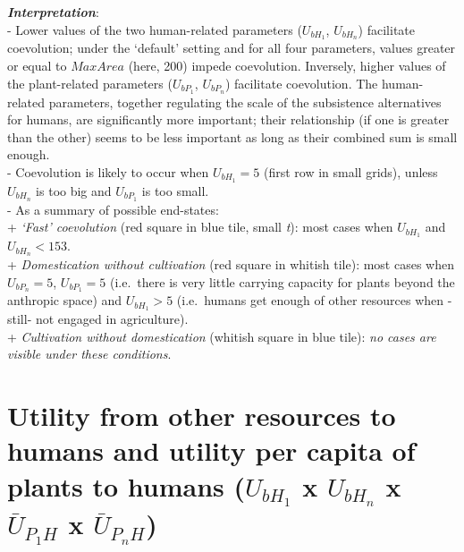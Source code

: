\documentclass[]{book}
\begin{document}
\textbf{\emph{Interpretation}}:\\
- Lower values of the two human-related parameters (\(U_{bH_{1}}\), \(U_{bH_{n}}\)) facilitate coevolution; under the `default' setting and for all four parameters, values greater or equal to \(MaxArea\) (here, 200) impede coevolution. Inversely, higher values of the plant-related parameters (\(U_{bP_{1}}\), \(U_{bP_{n}}\)) facilitate coevolution. The human-related parameters, together regulating the scale of the subsistence alternatives for humans, are significantly more important; their relationship (if one is greater than the other) seems to be less important as long as their combined sum is small enough.\\
- Coevolution is likely to occur when \(U_{bH_{1}}=5\) (first row in small grids), unless \(U_{bH_{n}}\) is too big and \(U_{bP_{1}}\) is too small.\\
- As a summary of possible end-states:\\
+ \emph{`Fast' coevolution} (red square in blue tile, small \emph{t}): most cases when \(U_{bH_{1}}\) and \(U_{bH_{n}}<153\).\\
+ \emph{Domestication without cultivation} (red square in whitish tile): most cases when \(U_{bP_{n}}=5\), \(U_{bP_{1}}=5\) (i.e.~there is very little carrying capacity for plants beyond the anthropic space) and \(U_{bH_{1}}>5\) (i.e.~humans get enough of other resources when -still- not engaged in agriculture).\\
+ \emph{Cultivation without domestication} (whitish square in blue tile): \emph{no cases are visible under these conditions}.

\newpage

\hypertarget{utility-from-other-resources-to-humans-and-utility-per-capita-of-plants-to-humans-u_bh_1-x-u_bh_n-x-baru_p_1h-x-baru_p_nh}{%
\section{\texorpdfstring{Utility from other resources to humans and utility per capita of plants to humans (\(U_{bH_{1}}\) x \(U_{bH_{n}}\) x \(\bar{U}_{P_{1}H}\) x \(\bar{U}_{P_{n}H}\))}{Utility from other resources to humans and utility per capita of plants to humans (U\_\{bH\_\{1\}\} x U\_\{bH\_\{n\}\} x \textbackslash{}bar\{U\}\_\{P\_\{1\}H\} x \textbackslash{}bar\{U\}\_\{P\_\{n\}H\})}}\label{utility-from-other-resources-to-humans-and-utility-per-capita-of-plants-to-humans-u_bh_1-x-u_bh_n-x-baru_p_1h-x-baru_p_nh}}
\end{document}
